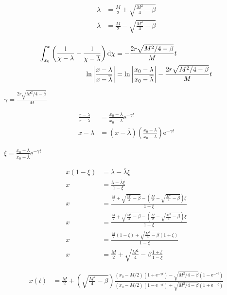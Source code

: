 \begin{equation}
	\begin{array}{cc}
	\lambda&=\frac{M}{2}+\sqrt{\frac{M^2}{4}-\beta} \\
	\overline{\lambda}&=\frac{M}{2}-\sqrt{\frac{M^2}{4}-\beta} \\
	\end{array}
\end{equation}

\begin{align*}
\int_{x_0}^{x} \left(\frac{1}{\chi - \lambda}-\frac{1}{\chi - \overline{\lambda}}\right)\mathrm{d} \chi &=-\frac{2r\sqrt{M^2/4-\beta}}{M}t \\
	\ln\left|\frac{x - \lambda}{x - \overline{\lambda}}\right|&=\ln\left|\frac{x_0- \lambda}{x_0 - \overline{\lambda}}\right|-\frac{2r\sqrt{M^2/4-\beta}}{M}t
\end{align*}
	
$\gamma=\frac{2r\sqrt{M^2/4-\beta}}{M}$

\begin{align}
\frac{x - \lambda}{x - \overline{\lambda}} &=\frac{x_0- \lambda}{x_0- \overline{\lambda}}\mathrm e^{-\gamma t} \\
x-\lambda &=\left(x-\overline{\lambda}\right)\left(\frac{x_0- \lambda}{x_0- \overline{\lambda}}\right)\mathrm e^{-\gamma t}
\end{align}

$\xi=\frac{x_0-\lambda}{x_0-\overline{\lambda}}\mathrm{e}^{-\gamma t}$

\begin{align*}
	x\left(1-\xi\right)&=\lambda-\overline{\lambda}\xi\\
	x&=\frac{\lambda-\overline{\lambda}\xi}{1-\xi} \\	
	x&=\frac{\frac{M}{2}+\sqrt{\frac{M^2}{4}-\beta}-\left(\frac{M}{2}-\sqrt{\frac{M^2}{4}-\beta}\right)\xi}{1-\xi}\\
	x&=\frac{\frac{M}{2}+\sqrt{\frac{M^2}{4}-\beta}-\left(\frac{M}{2}-\sqrt{\frac{M^2}{4}-\beta}\right)\xi}{1-\xi}\\
	x&=\frac{\frac{M}{2}\left(1-\xi\right)+\sqrt{\frac{M^2}{4}-\beta}\left(1+\xi\right)}{1-\xi}\\
	x&=\frac{M}{2}+\sqrt{\frac{M^2}{4}-\beta}\frac{1+\xi}{1-\xi}
\end{align*}

\begin{align}
	x(t)&=\frac{M}{2}+\left(\sqrt{\frac{M^2}{4}-\beta}\right)\frac{\left(x_0-M/2\right)\left(1+\mathrm e^{-\gamma t}\right)-\sqrt{M^2/4-\beta}\left(1-\mathrm{e}^{-\gamma t}\right)}{\left(x_0-M/2\right)\left(1-\mathrm e^{-\gamma t}\right)+\sqrt{M^2/4-\beta}\left(1+\mathrm{e}^{-\gamma t}\right)} \label{eq: Time Expression for Harvest}
\end{align}

